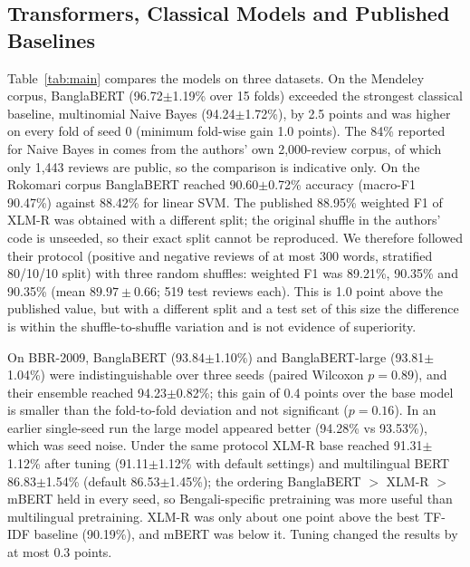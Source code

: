 \documentclass[journal]{IEEEtran}
\newcommand{\pmstd}[2]{#1$\pm$#2}
\begin{document}
\subsection{Transformers, Classical Models and Published Baselines}
Table~\ref{tab:main} compares the models on three datasets. On the Mendeley corpus, BanglaBERT (\pmstd{96.72}{1.19}\% over 15 folds) exceeded the strongest classical baseline, multinomial Naive Bayes (\pmstd{94.24}{1.72}\%), by 2.5 points and was higher on every fold of seed 0 (minimum fold-wise gain 1.0 points). The 84\% reported for Naive Bayes in \cite{hossain2020} comes from the authors' own 2,000-review corpus, of which only 1,443 reviews are public, so the comparison is indicative only. On the Rokomari corpus BanglaBERT reached \pmstd{90.60}{0.72}\% accuracy (macro-F1 90.47\%) against 88.42\% for linear SVM. The published 88.95\% weighted F1 of XLM-R \cite{sarker2022} was obtained with a different split; the original shuffle in the authors' code is unseeded, so their exact split cannot be reproduced. We therefore followed their protocol (positive and negative reviews of at most 300 words, stratified 80/10/10 split) with three random shuffles: weighted F1 was 89.21\%, 90.35\% and 90.35\% (mean $89.97\pm0.66$; 519 test reviews each). This is 1.0 point above the published value, but with a different split and a test set of this size the difference is within the shuffle-to-shuffle variation and is not evidence of superiority.

On BBR-2009, BanglaBERT (\pmstd{93.84}{1.10}\%) and BanglaBERT-large (\pmstd{93.81}{1.04}\%) were indistinguishable over three seeds (paired Wilcoxon $p=0.89$), and their ensemble reached \pmstd{94.23}{0.82}\%; this gain of 0.4 points over the base model is smaller than the fold-to-fold deviation and not significant ($p=0.16$). In an earlier single-seed run the large model appeared better (94.28\% vs 93.53\%), which was seed noise. Under the same protocol XLM-R base reached \pmstd{91.31}{1.12}\% after tuning (\pmstd{91.11}{1.12}\% with default settings) and multilingual BERT \pmstd{86.83}{1.54}\% (default \pmstd{86.53}{1.45}\%); the ordering BanglaBERT $>$ XLM-R $>$ mBERT held in every seed, so Bengali-specific pretraining was more useful than multilingual pretraining. XLM-R was only about one point above the best TF-IDF baseline (90.19\%), and mBERT was below it. Tuning changed the results by at most 0.3 points.
\end{document}

